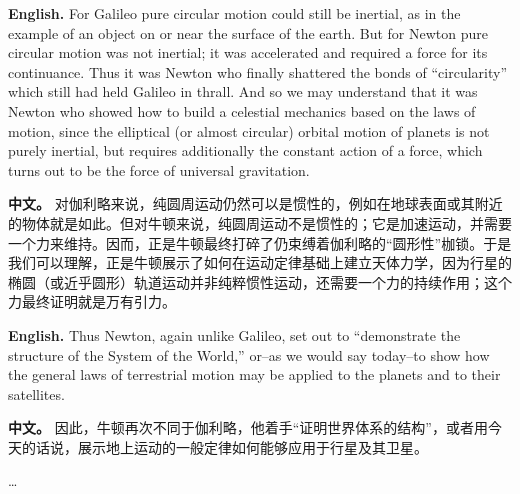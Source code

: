 \noindent\textbf{English.} For Galileo pure circular motion could still be inertial, as in the example of an object on or near the surface of the earth. But for Newton pure circular motion was not inertial; it was accelerated and required a force for its continuance. Thus it was Newton who finally shattered the bonds of ``circularity'' which still had held Galileo in thrall. And so we may understand that it was Newton who showed how to build a celestial mechanics based on the laws of motion, since the elliptical (or almost circular) orbital motion of planets is not purely inertial, but requires additionally the constant action of a force, which turns out to be the force of universal gravitation.
\par\noindent\textbf{中文。} 对伽利略来说，纯圆周运动仍然可以是惯性的，例如在地球表面或其附近的物体就是如此。但对牛顿来说，纯圆周运动不是惯性的；它是加速运动，并需要一个力来维持。因而，正是牛顿最终打碎了仍束缚着伽利略的“圆形性”枷锁。于是我们可以理解，正是牛顿展示了如何在运动定律基础上建立天体力学，因为行星的椭圆（或近乎圆形）轨道运动并非纯粹惯性运动，还需要一个力的持续作用；这个力最终证明就是万有引力。
\medskip

\noindent\textbf{English.} Thus Newton, again unlike Galileo, set out to ``demonstrate the structure of the System of the World,'' or--as we would say today--to show how the general laws of terrestrial motion may be applied to the planets and to their satellites.
\par\noindent\textbf{中文。} 因此，牛顿再次不同于伽利略，他着手“证明世界体系的结构”，或者用今天的话说，展示地上运动的一般定律如何能够应用于行星及其卫星。
\medskip

\begin{center}
\ldots
\end{center}

